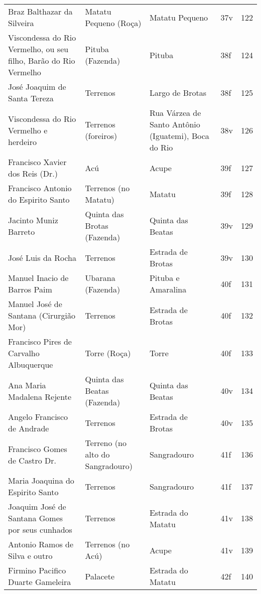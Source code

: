 \begin{table}[ht]
{\begin{minipage}{\textwidth}
\begin{tiny}
\begin{tabular}{p{4cm}p{4cm}p{4cm}ll}
Braz Balthazar da Silveira							&Matatu Pequeno (Roça)			&Matatu Pequeno				&37v			&122			\\
Viscondessa do Rio Vermelho, ou seu filho, Barão do Rio Vermelho		&Pituba (Fazenda)			&Pituba					&38f			&124			\\
José Joaquim de Santa Tereza							&Terrenos				&Largo de Brotas			&38f			&125			\\
Viscondessa do Rio Vermelho e herdeiro						&Terrenos (foreiros)			&Rua Várzea de Santo Antônio (Iguatemi), Boca do Rio				&38v			&126			\\
Francisco Xavier dos Reis (Dr.)							&Acú					&Acupe					&39f			&127			\\
Francisco Antonio do Espirito Santo						&Terrenos (no Matatu)			&Matatu					&39f			&128			\\
Jacinto Muniz Barreto								&Quinta das Brotas (Fazenda)		&Quinta das Beatas			&39v			&129			\\
José Luis da Rocha								&Terrenos				&Estrada de Brotas					&39v			&130			\\
Manuel Inacio de Barros Paim							&Ubarana (Fazenda)			&Pituba e Amaralina			&40f			&131			\\
Manuel José de Santana (Cirurgião Mor)						&Terrenos				&Estrada de Brotas					&40f			&132			\\
Francisco Pires de Carvalho Albuquerque						&Torre (Roça)				&Torre					&40f			&133			\\
Ana Maria Madalena Rejente							&Quinta das Beatas (Fazenda)		&Quinta das Beatas			&40v			&134			\\
Angelo Francisco de Andrade							&Terrenos				&Estrada de Brotas					&40v			&135			\\
Francisco Gomes de Castro Dr.							&Terreno (no alto do Sangradouro)	&Sangradouro				&41f			&136			\\
Maria Joaquina do Espirito Santo						&Terrenos				&Sangradouro					&41f			&137			\\
Joaquim José de Santana Gomes por seus cunhados					&Terrenos				&Estrada do Matatu					&41v			&138			\\
Antonio Ramos de Silva e outro							&Terrenos (no Acú)			&Acupe					&41v			&139			\\
Firmino Pacifico Duarte Gameleira						&Palacete				&Estrada do Matatu					&42f			&140			\\
\bottomrule
\end{tabular} 
\end{tiny}
\end{minipage}
}
{}
\end{table}
